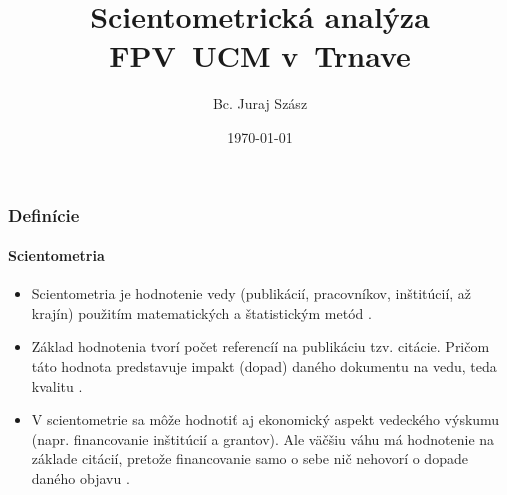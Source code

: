 \documentclass{beamer}
\author{Bc. Juraj Szász}
\title{Scientometrická analýza FPV~UCM v~Trnave}
\date{\today}
\begin{document}

\frame{\maketitle}

\frame{\tableofcontents}

\begin{frame}
  \frametitle{Definície}
  \framesubtitle{Scientometria}
  \begin{itemize}
    \item Scientometria je hodnotenie vedy (publikácií, pracovníkov,
      inštitúcií, až krajín) použitím matematických a štatistickým metód
      \citep{Vinkler2001}.
    \item Základ hodnotenia tvorí počet referencíí na publikáciu tzv. citácie.
      Pričom táto hodnota predstavuje impakt (dopad) daného dokumentu na vedu,
      teda kvalitu \citep{Vavrikova2008}.
    \item V scientometrie sa môže hodnotiť aj ekonomický aspekt vedeckého
      výskumu (napr. financovanie inštitúcií a grantov). Ale väčšiu váhu má
      hodnotenie na základe citácií, pretože financovanie samo o sebe nič
      nehovorí o dopade daného objavu \citep{Bellis2009}.
  \end{itemize}
\end{frame}

\end{document}
